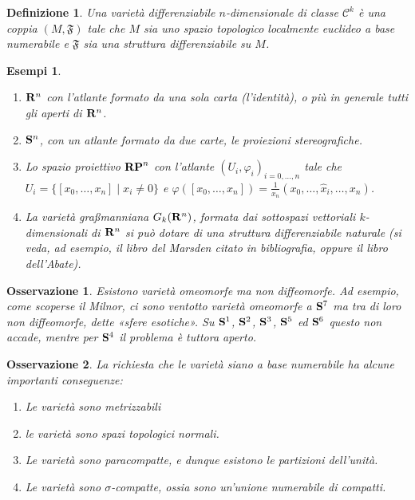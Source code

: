 \documentclass{article}
\newcommand{\PHI}{\varphi}
\newcommand{\ci}[1]{\mathscr{#1}}%
\newcommand{\g}[1]{\mathfrak{#1}}
\newtheorem{definizione}{ Definizione}
\newtheorem{oss}{ Osservazione}
\newtheorem*{esempi}{ Esempi}
\begin{document}
 \begin{definizione}
  Una varietà differenziabile $n$-dimensionale di classe $\ci{C}^k$ è una coppia $(M, \g{F})$
  tale che $M$ sia uno spazio topologico localmente euclideo a base numerabile e $\g{F}$ sia una struttura
  differenziabile su $M$.
 \end{definizione}
 
 \begin{esempi}
  \begin{enumerate}[label=\bf\Roman*)]
   \item ${ \bf R}^n$ con l'atlante formato da una sola carta (l'identità), o più in generale tutti gli aperti di ${\bf R }^n$.
   \item ${\bf S}^n$, con un atlante formato da due carte, le proiezioni stereografiche.
   \item Lo spazio proiettivo ${\bf RP}^n$ con l'atlante $(U_i,\PHI_i)_{i=0,\dots,n}$ tale che
   $U_i=\{ [x_0,\dots,x_n]\; |\; x_i\neq 0\}$ e $\PHI([x_0,\dots,x_n])=\frac{1}{x_n}(x_0,\dots,\hat{x}_i,\dots,x_n)$.
   \item La varietà graßmanniana $G_k({\bf  R}^n)$, formata dai sottospazi vettoriali $k$-dimensionali
   di ${\bf R}^n$ si può dotare di una struttura differenziabile naturale (si veda, ad
   esempio, il libro del Marsden citato in bibliografia, oppure il libro dell'Abate).
  \end{enumerate}
 \end{esempi}
 
 \begin{oss}
  Esistono varietà omeomorfe ma non diffeomorfe. Ad esempio, come scoperse il Milnor, ci sono ventotto varietà
  omeomorfe a ${\bf S}^7$ ma tra di loro non diffeomorfe, dette «sfere esotiche». Su ${\bf S}^1$, ${\bf S}^2$, ${\bf S}^3$, ${\bf S}^5$
  ed ${\bf S}^6$ questo non accade, mentre per ${\bf S}^4$ il problema è tuttora aperto.
 \end{oss}
 
 \begin{oss}
  La richiesta che le varietà siano a base numerabile ha alcune importanti conseguenze:
  \begin{enumerate}[label=\bf\Roman*)]
   \item Le varietà sono metrizzabili
   \item le varietà sono spazi topologici normali.
   \item Le varietà sono paracompatte, e dunque esistono le partizioni dell'unità.
   \item Le varietà sono $\sigma$-compatte, ossia sono un'unione numerabile di compatti.
  \end{enumerate}
 \end{oss}
\end{document}
